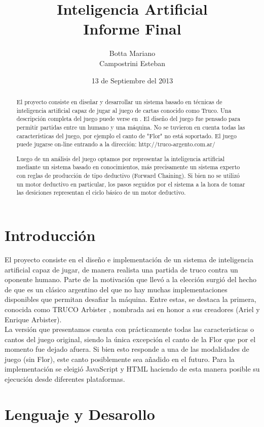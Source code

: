 \documentclass[12pt,a4paper]{article}
\title{Inteligencia Artificial\\ 
\large Informe Final
}
\author{Botta Mariano \\ Campostrini Esteban}
\date{ \small 13 de Septiembre del 2013}
\begin{document}
\maketitle 

\begin{abstract}
El proyecto consiste en dise\~nar y desarrollar un sistema basado en t\'ecnicas de inteligencia artificial capaz de jugar al 
juego de cartas conocido como Truco.
Una descripci\'on completa del juego puede verse en \cite{reglas}. El dise\~no del juego fue pensado para permitir partidas 
entre un humano y una m\'aquina. No se tuvieron en cuenta todas las caracter\'isticas del juego, por ejemplo el canto de "Flor" 
no est\'a soportado. El juego puede jugarse on-line entrando a la direcci\'on: http://truco-argento.com.ar/

Luego de un an\'alisis del juego optamos por representar la inteligencia artificial mediante un sistema basado en conocimientos, 
m\'as precisamente un sistema experto con reglas de producci\'on de tipo deductivo (Forward Chaining). Si bien no se utiliz\'o un motor
deductivo en particular, los pasos seguidos por el sistema a la hora de tomar las desiciones representan el ciclo b\'asico de un motor deductivo.
\end{abstract}
\pagebreak

\section{Introducci\'on}
El proyecto consiste en el dise\~no e implementaci\'on de un sistema de inteligencia artificial capaz de jugar, de manera realista
una partida de truco contra un oponente humano. Parte de la motivaci\'on que llev\'o a la elecci\'on surgi\'o del hecho de
que es un cl\'asico argentino del que no hay muchas implementaciones disponibles que permitan desafiar la m\'aquina. Entre
estas, se destaca la primera, conocida como TRUCO Arbister \cite{arbister}, nombrada asi en honor a sus creadores (Ariel y Enrique Arbister).\\
La versi\'on que presentamos cuenta con pr\'acticamente todas las caracteristicas o cantos del juego original, siendo la
\'unica excepci\'on el canto de la Flor que por el momento fue dejado afuera. Si bien esto responde a una de las modalidades de 
juego (sin Flor), este canto posiblemente sea a\~nadido en el futuro.
Para la implementaci\'on se eleigi\'o JavaScript y HTML haciendo de esta manera posible su ejecuci\'on desde diferentes plataformas. 


\section{Lenguaje y Desarollo}
\end{document}

